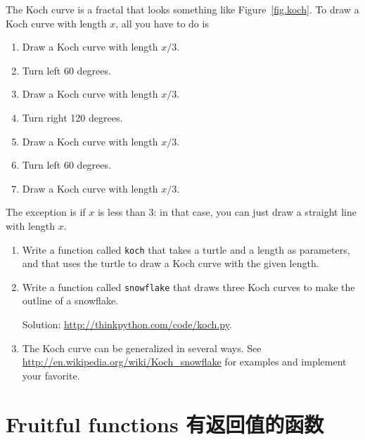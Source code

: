\documentclass[10pt]{book}
\begin{document}
\begin{CJK}{UTF8}{gbsn}
\begin{exercise}

The Koch curve is a fractal that looks something like
Figure~\ref{fig.koch}.  To draw a Koch curve with length $x$, all you
have to do is

\begin{enumerate}

\item Draw a Koch curve with length $x/3$.

\item Turn left 60 degrees.

\item Draw a Koch curve with length $x/3$.

\item Turn right 120 degrees.

\item Draw a Koch curve with length $x/3$.

\item Turn left 60 degrees.

\item Draw a Koch curve with length $x/3$.

\end{enumerate}

The exception is if $x$ is less than 3: in that case,
you can just draw a straight line with length $x$.

\begin{enumerate}

\item Write a function called {\tt koch} that takes a turtle and
a length as parameters, and that uses the turtle to draw a Koch
curve with the given length.

\item Write a function called {\tt snowflake} that draws three
Koch curves to make the outline of a snowflake.

Solution: \url{http://thinkpython.com/code/koch.py}.

\item The Koch curve can be generalized in several ways.  See
\url{http://en.wikipedia.org/wiki/Koch_snowflake} for examples and
implement your favorite.

\end{enumerate}
\end{exercise}


\chapter{Fruitful functions 有返回值的函数}
\label{fruitchap}


\end{CJK}
\end{document}
